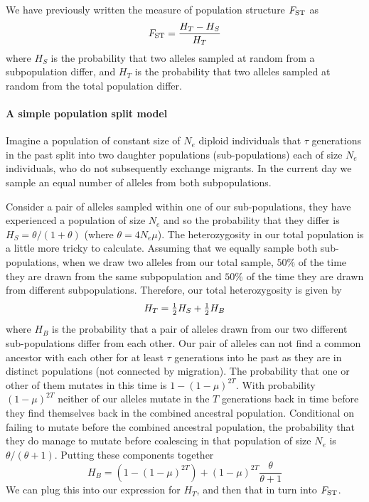We have previously written the measure of population structure
$F_{\mathrm{ST}}$ as
\begin{equation}
F_{\mathrm{ST}} = \frac{H_T-H_S}{H_T}
\end{equation}
where $H_S$ is the probability that two alleles sampled at random from a
subpopulation differ, and $H_T$ is the probability that two alleles
sampled at random from the total population differ. 

\paragraph{A simple population split model}
Imagine a population of constant size of $N_e$ diploid individuals that
$\tau$ generations in the past split into two daughter populations (sub-populations)
each of size $N_e$ individuals, who do not subsequently exchange
migrants. In the current day we sample an equal number of alleles
from both subpopulations.

Consider a pair of alleles sampled within one of our
sub-populations, they have experienced a population of size $N_e$
and so the probability that they differ is $H_S = \theta/(1+\theta)$
(where $\theta=4N_e\mu$).
The heterozygosity in our total population is a little more tricky to
calculate. Assuming that we equally sample both sub-populations, when we draw two alleles from our total
sample, $50\%$ of the time they are drawn from the same
subpopulation and $50\%$ of the time they are drawn from different
subpopulations. Therefore, our total heterozygosity is given by
\begin{equation}
H_T = \tfrac{1}{2} H_S + \tfrac{1}{2} H_B
\end{equation}
where $H_B$ is the probability that a pair of alleles drawn from our
two different sub-populations differ from each other. Our pair of
alleles can not find a common ancestor with each other for at least $\tau$
generations into he past as they are in distinct populations (not
connected by migration). The probability that one or other of them
mutates in this time is $1-(1-\mu)^{2T}$. With probability
$(1-\mu)^{2T} $ neither of our alleles mutate in the $T$ generations
back in time before they find themselves back in the combined ancestral 
population. Conditional on failing to mutate before the combined ancestral
population, the probability that they do manage to mutate before
coalescing in that population of size $N_e$ is
$\theta/(\theta+1)$. Putting these components together
\begin{equation}
H_B = \left( 1-(1-\mu)^{2T} \right) + (1-\mu)^{2T}
  \frac{\theta}{\theta+1} 
\end{equation}
We can plug this into our expression for $H_T$, and then that in turn
into $F_{\mathrm{ST}}$.

